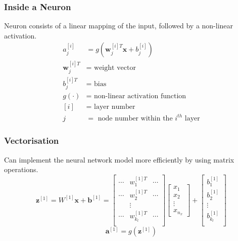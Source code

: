 \documentclass{beamer}
\newcommand{\mb}[1]{\mathbf{#1}}
\begin{document}
\begin{frame}
  \frametitle{Inside a Neuron}
  Neuron consists of a linear mapping of the input, followed by a non-linear activation.
  \begin{align*}
    a^{[i]}_j &= g( \mb{w}^{[i]T}_j \mb{x} + b^{[i]}_j) 
    \\
    \mb{w}^{[i]T}_j &= \text{ weight vector}
    \\
    b^{[i]T}_j  &= \text{ bias}
    \\
    g( \cdot ) &= \text{ non-linear activation function}
    \\
    [i] &= \text{ layer number}
    \\
    j &= \text{ node number within the } i^{th} \text{ layer}
  \end{align*}

  
\end{frame}
% 
% 
% 
% 
\begin{frame}
  \frametitle{Vectorisation}
  Can implement the neural network model more efficiently by using matrix operations.
  \begin{equation*}
    \mathbf{z}^{[1]} = W^{[1]}\mathbf{x} + \mathbf{b}^{[1]} = 
    \begin{bmatrix}
      \cdots & w_{1}^{[1]T} & \cdots \\
      \cdots & w_{2}^{[1]T} & \cdots \\
      & \vdots       &  \\
      \cdots & w_{k_l}^{[1]T} & \cdots \\
    \end{bmatrix}
    \begin{bmatrix}
      x_1\\
      x_2\\
      \vdots\\
      x_{n_x}
    \end{bmatrix}
    + 
    \begin{bmatrix}
      b_{1}^{[1]} \\
      b_{2}^{[1]} \\
      \vdots \\
      b_{k_l}^{[1]} \\
    \end{bmatrix}
  \end{equation*}
  \vspace*{1cm}
  \begin{equation*}
    \mb{a}^{[1]} = g( \mb{z}^{[1]} )
  \end{equation*}
\end{frame}
\end{document}
